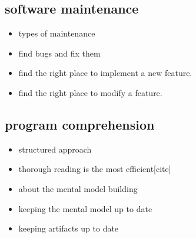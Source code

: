 \subsection{software maintenance}

\begin{itemize}
\item types of maintenance
\item find bugs and fix them
\item find the right place to implement a new feature.
\item find the right place to modify a feature.
\end{itemize}

\subsection{program comprehension}

\begin{itemize}
\item structured approach
\item thorough reading is the most efficient[cite]
\item about the mental model building
\item keeping the mental model up to date
\item keeping artifacts up to date
\end{itemize}



